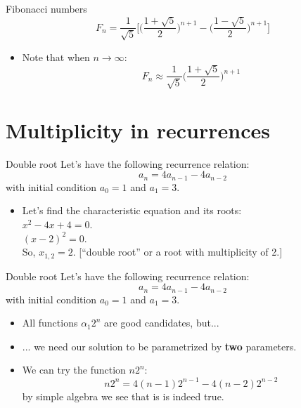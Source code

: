 \documentclass{beamer}
\begin{document}
\begin{frame}{Fibonacci numbers}
    $$ F_n = \frac{1}{\sqrt{5}} \Bigg[ \Bigg(\frac{1 + \sqrt{5}}{2} \Bigg)^{n+1} - \Bigg(\frac{1 - \sqrt{5}}{2} \Bigg)^{n+1} \Bigg] $$
    \begin{itemize}
        \item Note that when $n \rightarrow \infty$:
        $$ F_n \approx \frac{1}{\sqrt{5}} \Bigg(\frac{1 + \sqrt{5}}{2} \Bigg)^{n+1} $$
    \end{itemize}
    \begin{figure}
    \centering
    \def\svgwidth{0.45\columnwidth}
    
    \end{figure}
\end{frame}

\section*{Multiplicity in recurrences}

\begin{frame}{Double root}
    Let's have the following recurrence relation:
        $$ a_n = 4 a_{n-1} - 4 a_{n-2} $$
    with initial condition $a_0 = 1$ and $a_1 = 3$.
    \begin{itemize}
     \item Let's find the characteristic equation and its roots: \\
     $ x^2 - 4x + 4 = 0 $. \\
     $ (x - 2)^2 = 0 $. \\
     So, $x_{1,2} = 2$.  \hspace{1cm} {\scriptsize [``double root'' or a root with multiplicity of 2.]}
    \end{itemize}
\end{frame}

\begin{frame}{Double root}
    Let's have the following recurrence relation:
        $$ a_n = 4 a_{n-1} - 4 a_{n-2} $$
    with initial condition $a_0 = 1$ and $a_1 = 3$.
    \begin{itemize}
     \item All functions $\alpha_1 2^n$ are good candidates, but...
     \item ... we need our solution to be parametrized by \textbf{two} parameters.
     \item We can try the function $n 2^n$:
     $$ n 2^n = 4(n -1) 2^{n-1} - 4 (n - 2) 2^{n-2} $$
     by simple algebra we see that is is indeed true.
    \end{itemize}
\end{frame}
\end{document}
